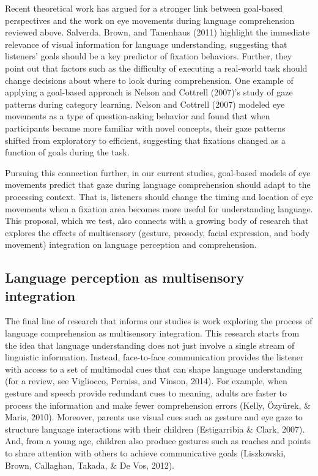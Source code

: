 \documentclass[,man,floatsintext]{apa6}
\begin{document}
Recent theoretical work has argued for a stronger link between
goal-based perspectives and the work on eye movements during language
comprehension reviewed above. Salverda, Brown, and Tanenhaus (2011)
highlight the immediate relevance of visual information for language
understanding, suggesting that listeners' goals should be a key
predictor of fixation behaviors. Further, they point out that factors
such as the difficulty of executing a real-world task should change
decisions about where to look during comprehension. One example of
applying a goal-based approach is Nelson and Cottrell (2007)'s study of
gaze patterns during category learning. Nelson and Cottrell (2007)
modeled eye movements as a type of question-asking behavior and found
that when participants became more familiar with novel concepts, their
gaze patterns shifted from exploratory to efficient, suggesting that
fixations changed as a function of goals during the task.

Pursuing this connection further, in our current studies, goal-based
models of eye movements predict that gaze during language comprehension
should adapt to the processing context. That is, listeners should change
the timing and location of eye movements when a fixation area becomes
more useful for understanding language. This proposal, which we test,
also connects with a growing body of research that explores the effects
of multisensory (gesture, prosody, facial expression, and body movement)
integration on language perception and comprehension.

\hypertarget{language-perception-as-multisensory-integration}{%
\subsection{Language perception as multisensory
integration}\label{language-perception-as-multisensory-integration}}

The final line of research that informs our studies is work exploring
the process of language comprehension as multisensory integration. This
research starts from the idea that language understanding does not just
involve a single stream of linguistic information. Instead, face-to-face
communication provides the listener with access to a set of multimodal
cues that can shape language understanding (for a review, see Vigliocco,
Perniss, and Vinson, 2014). For example, when gesture and speech provide
redundant cues to meaning, adults are faster to process the information
and make fewer comprehension errors (Kelly, Özyürek, \& Maris, 2010).
Moreover, parents use visual cues such as gesture and eye gaze to
structure language interactions with their children (Estigarribia \&
Clark, 2007). And, from a young age, children also produce gestures such
as reaches and points to share attention with others to achieve
communicative goals (Liszkowski, Brown, Callaghan, Takada, \& De Vos,
2012).
\end{document}

